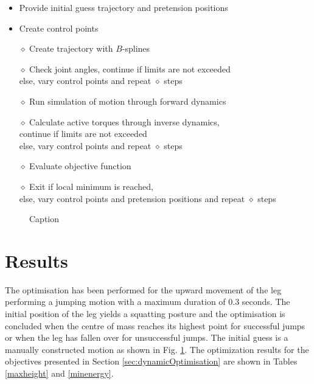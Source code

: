 \documentclass[letterpaper, 10 pt, conference]{ieeeconf}  %
\begin{document}
\begin{itemize}
	\item Provide initial guess trajectory and pretension positions
	\item Create control points\\
	\item[$\diamond$] Create trajectory with $B$-splines
	\item[$\diamond$] Check joint angles, continue if limits are not exceeded \\else, vary control points and repeat $\diamond$ steps
	\item[$\diamond$] Run simulation of motion through forward dynamics
	\item[$\diamond$] Calculate active torques through inverse dynamics,\\ continue if limits are not exceeded \\else, vary control points and repeat $\diamond$ steps
	\item[$\diamond$] Evaluate objective function\\
	\item[$\diamond$] Exit if local minimum is reached, \\ else, vary control points and pretension positions and repeat $\diamond$ steps
\end{itemize}

	





   \begin{figure}[thpb]
      \centering
      \caption{Caption}
      \label{fig:seq}
   \end{figure}
   
\section{Results} \label{sec:results}

The optimisation has been performed for the upward movement of the leg performing a jumping motion with a maximum duration of 0.3 seconds. The initial position of the leg yields a squatting posture and the optimisation is concluded when the centre of mass reaches its highest point for successful jumps or when the leg has fallen over for unsuccessful jumps. The initial guess is a manually constructed motion as shown in Fig. \ref{fig:seq}. The optimization results for the objectives presented in Section \ref{sec:dynamicOptimisation} are shown in Tables \ref{maxheight} and \ref{minenergy}.
\end{document}
